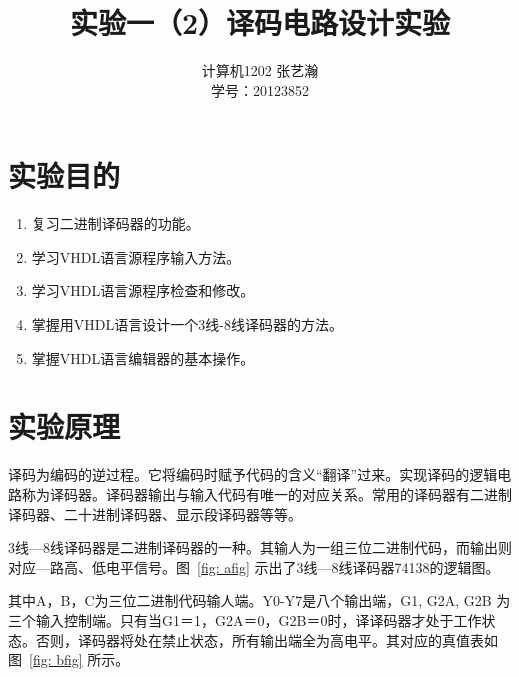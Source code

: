 \documentclass{article}
\begin{document}
\begin{CJK*}{UTF8}{gbsn}
\CJKtilde

\title{实验一（2）译码电路设计实验}

\author{计算机1202 张艺瀚\\学号：20123852}
\maketitle

\section{实验目的}
\begin{enumerate}
\item 复习二进制译码器的功能。
\item 学习VHDL语言源程序输入方法。
\item 学习VHDL语言源程序检查和修改。
\item 掌握用VHDL语言设计一个3线-8线译码器的方法。
\item 掌握VHDL语言编辑器的基本操作。
\end{enumerate}

\section{实验原理}
译码为编码的逆过程。它将编码时赋予代码的含义“翻译”过来。实现译码的逻辑电路称为译码器。译码器输出与输入代码有唯一的对应关系。常用的译码器有二进制译码器、二十进制译码器、显示段译码器等等。

3线—8线译码器是二进制译码器的一种。其输人为一组三位二进制代码，而输出则对应—路高、低电平信号。图~\ref{fig: afig} 示出了3线—8线译码器74138的逻辑图。

其中A，B，C为三位二进制代码输人端。Y0-Y7是八个输出端，G1, G2A, G2B 为三个输入控制端。只有当G1＝1，G2A＝0，G2B＝0时，译译码器才处于工作状态。否则，译码器将处在禁止状态，所有输出端全为高电平。其对应的真值表如图~\ref{fig: bfig} 所示。


\end{CJK*}
\end{document}
